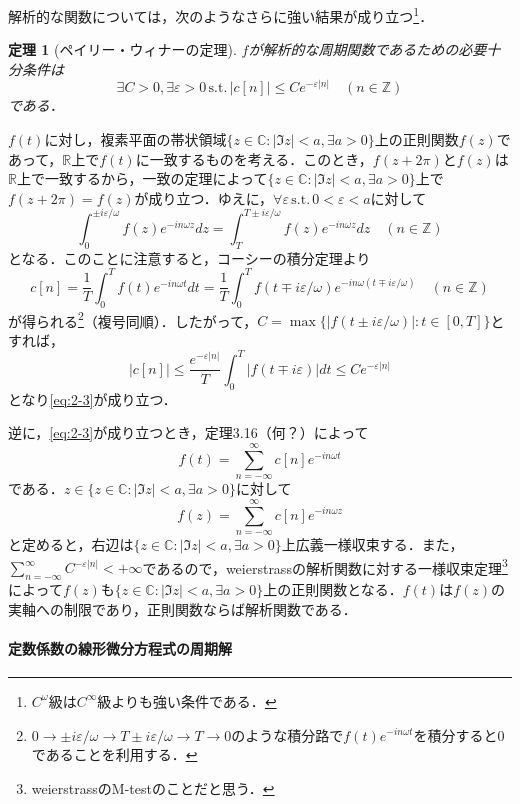 \documentclass[dvipdfmx,a4j,10pt]{jsarticle}
\makeatletter
\theoremstyle{mystyle1}
\newtheorem{theorem}{定理}[section]
\theoremstyle{mystyle3}
\theoremstyle{mystyle4}
\theoremstyle{mystyle6}
\theoremstyle{mystyle2}
\theoremstyle{mystyle5}
\renewenvironment{proof}[1][\proofname]{\par
  \pushQED{\qed}%
  \normalfont
  \topsep6\p@\@plus6\p@ \trivlist
  \item[\hskip\labelsep{\bfseries\sffamily #1}]\ignorespaces
}{%
  \popQED\endtrivlist\@endpefalse
}
\renewcommand\proofname{証明}
\newenvironment{thm}[1][]
{\begin{tcolorbox}[
    enhanced,
    boxrule=0pt,
    arc=0mm,
    frame hidden,
    borderline west={2pt}{-4pt}{red},
    breakable = true
    ]
    \begin{theorem}[#1]
}
{\end{theorem}\end{tcolorbox}}
\makeatother
\begin{document}
解析的な関数については，次のようなさらに強い結果が成り立つ\footnote{$C^\omega$級は$C^\infty$級よりも強い条件である．}．

\begin{thm}[ペイリー・ウィナーの定理]\label{thm:2-5}
	$f$が解析的な周期関数であるための必要十分条件は
	\begin{equation}\label{eq:2-3}
		\exists C>0,\exists \varepsilon>0\,\textrm{s.t.}\,|c[n]|\leq Ce^{-\varepsilon|n|}\quad(n\in\mathbb{Z})
	\end{equation}
	である．
\end{thm}

\begin{proof}
	$f(t)$に対し，複素平面の帯状領域$\{z\in\mathbb{C}:|\Im z|<a,\exists a>0\}$上の正則関数$f(z)$であって，$\mathbb{R}$上で$f(t)$に一致するものを考える．このとき，$f(z+2\pi)$と$f(z)$は$\mathbb{R}$上で一致するから，一致の定理によって$\{z\in\mathbb{C}:|\Im z|<a,\exists a>0\}$上で$f(z+2\pi)=f(z)$が成り立つ．ゆえに，$\forall \varepsilon\,\textrm{s.t.}\,0<\varepsilon<a$に対して
	\[
		\int_0^{\pm i\varepsilon/\omega}f(z)e^{-in\omega z}dz=\int_T^{T\pm i\varepsilon/\omega}f(z)e^{-in\omega z}dz\quad(n\in\mathbb{Z})
	\]
	となる．このことに注意すると，コーシーの積分定理より
	\[
		c[n]=\frac{1}{T}\int_0^T f(t)e^{-in\omega t}dt=\frac{1}{T}\int_0^T f(t\mp i\varepsilon/\omega)e^{-in\omega (t\mp i\varepsilon/\omega)}\quad(n\in\mathbb{Z})
	\]
	が得られる\footnote{$0\to \pm i\varepsilon/\omega\to T\pm i\varepsilon/\omega\to T \to 0$のような積分路で$f(t)e^{-in\omega t}$を積分すると$0$であることを利用する．}（複号同順）．したがって，$C=\max\{|f(t\pm i\varepsilon/\omega)|:t\in[0,T]\}$とすれば，
	\[
		|c[n]|\leq\frac{e^{-\varepsilon|n|}}{T}\int_0^T|f(t\mp i\varepsilon)|dt\leq Ce^{-\varepsilon|n|}
	\]
	となり\eqref{eq:2-3}が成り立つ．

	逆に，\eqref{eq:2-3}が成り立つとき，定理3.16（何？）によって
	\[
		f(t)=\sum_{n=-\infty}^\infty c[n]e^{-in\omega t}
	\]
	である．$z\in \{z\in\mathbb{C}:|\Im z|<a,\exists a>0\}$に対して
	\[
		f(z)=\sum_{n=-\infty}^\infty c[n]e^{-in\omega z}
	\]
	と定めると，右辺は$\{z\in\mathbb{C}:|\Im z|<a,\exists a>0\}$上広義一様収束する．また，$\sum_{n=-\infty}^\infty C^{-\varepsilon|n|}<+\infty$であるので，weierstrassの解析関数に対する一様収束定理\footnote{weierstrassのM-testのことだと思う．}によって$f(z)$も$\{z\in\mathbb{C}:|\Im z|<a,\exists a>0\}$上の正則関数となる．$f(t)$は$f(z)$の実軸への制限であり，正則関数ならば解析関数である．
\end{proof}

\paragraph{定数係数の線形微分方程式の周期解}
\end{document}
